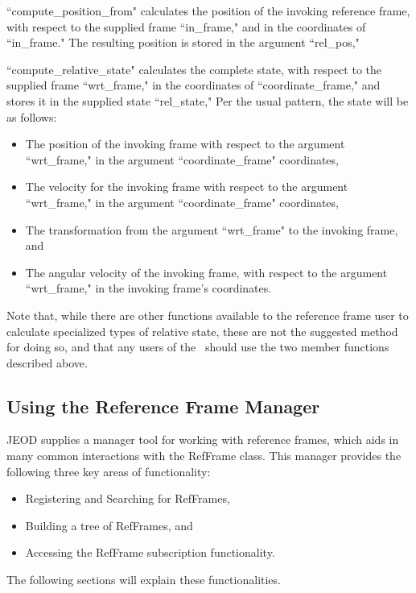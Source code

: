 ``compute\_position\_from" calculates the position of the invoking reference
frame, with respect to the supplied frame ``in\_frame," and in the coordinates
of ``in\_frame." The resulting position is stored in the argument ``rel\_pos,"

``compute\_relative\_state" calculates the complete state, with respect to
the supplied frame ``wrt\_frame," in the coordinates of ``coordinate\_frame,"
and stores it in the supplied state ``rel\_state," Per the usual pattern,
the state will be as follows:

\begin{itemize}
\item{The position of the invoking frame with respect to the argument ``wrt\_frame,"
in the argument ``coordinate\_frame" coordinates,}
\item{The velocity for the invoking frame with respect to the argument ``wrt\_frame,"
in the argument ``coordinate\_frame" coordinates,}
\item{The transformation from the argument ``wrt\_frame" to the invoking frame, and}
\item{The angular velocity of the invoking frame, with respect to the
argument ``wrt\_frame," in the invoking frame's coordinates}.
\end{itemize}

Note that, while there are other functions available to the reference frame
user to calculate specialized types of relative state, these are not the
suggested method for doing so, and that any users of the \ should
use the two member functions described above.

\subsection{Using the Reference Frame Manager}

JEOD supplies a manager tool for working with reference frames, which
aids in many common interactions with the RefFrame class. This
manager provides the following three key areas of functionality:

\begin{itemize}
\item{Registering and Searching for RefFrames},
\item{Building a tree of RefFrames, and}
\item{Accessing the RefFrame subscription functionality.}
\end{itemize}

The following sections will explain these functionalities.

